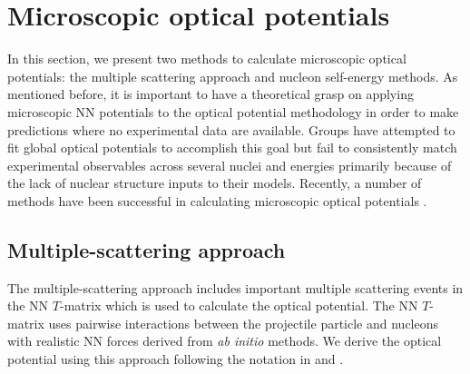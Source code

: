 \documentclass[preprintnumbers,floatfix,aps,prc,preprint,nofootinbib]{revtex4-1}
\begin{document}
\section{Microscopic optical potentials}
\label{sec:microscopic}


In this section, we present two methods to calculate microscopic optical potentials: the multiple scattering approach and nucleon self-energy methods. As mentioned before, it is important to have a theoretical grasp on applying microscopic NN potentials to the optical potential methodology in order to make predictions where no experimental data are available. Groups have attempted to fit global optical potentials to accomplish this goal but fail to consistently match experimental observables across several nuclei and energies primarily because of the lack of nuclear structure inputs to their models. Recently, a number of methods have been successful in calculating microscopic optical potentials \cite{Furumoto:2019anr, Idini:2019hkq, Rotureau:2016jpf}.


\subsection{Multiple-scattering approach}
\label{sec:multiple_scattering}


The multiple-scattering approach includes important multiple scattering events in the NN $T$-matrix which is used to calculate the optical potential. The NN $T$-matrix uses pairwise interactions between the projectile particle and nucleons with realistic NN forces derived from \textit{ab initio} methods. We derive the optical potential using this approach following the notation in \cite{Dickhoff:2018wdd} and \cite{Burrows:2018ggt}.
\\
\end{document}
